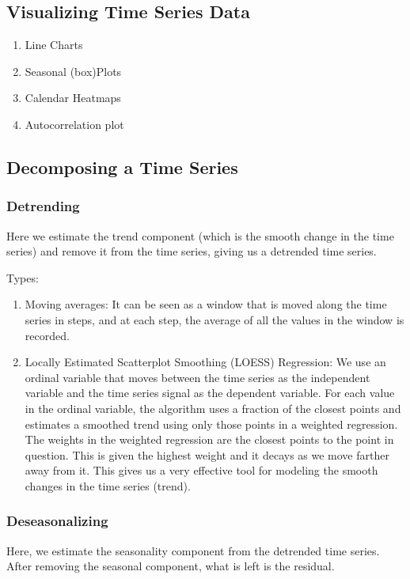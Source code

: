 \documentclass{article}
\begin{document}
\subsection{Visualizing Time Series Data}
\begin{enumerate}
    \item Line Charts 
    \item Seasonal (box)Plots 
    \item Calendar Heatmaps
    \item Autocorrelation plot
\end{enumerate}

\subsection{Decomposing a Time Series}
\subsubsection{Detrending}
Here we estimate the trend component (which is the smooth change in the time
series) and remove it from the time series, giving us a detrended time series.

Types:
\begin{enumerate}
    \item Moving averages: It can
    be seen as a window that is moved along the time series in steps, and at each step, the average of all
    the values in the window is recorded.
    \item Locally Estimated Scatterplot Smoothing (LOESS) Regression: We use an ordinal variable that moves between the time series as the independent
    variable and the time series signal as the dependent variable. For each value in the ordinal variable,
    the algorithm uses a fraction of the closest points and estimates a smoothed trend using only those
    points in a weighted regression. The weights in the weighted regression are the closest points to the
    point in question. This is given the highest weight and it decays as we move farther away from it. This
    gives us a very effective tool for modeling the smooth changes in the time series (trend).
\end{enumerate}

\subsubsection{Deseasonalizing}
Here, we estimate the seasonality component from the detrended time series.
After removing the seasonal component, what is left is the residual.
\end{document}
